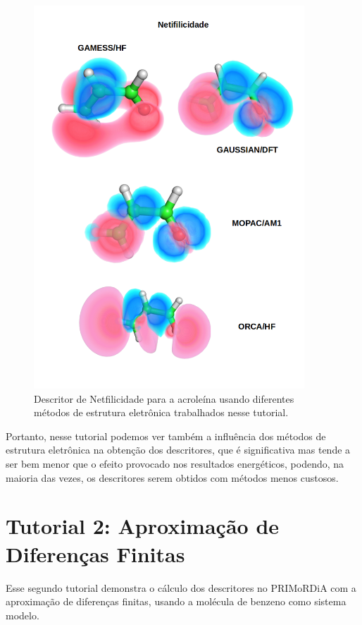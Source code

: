 \documentclass[a4paper,11pt]{refart}
\begin{document}
\hspace*{-\leftmarginwidth}
\begin{minipage}{\fullwidth}
\begin{figure}[H]
\begin{center}
\includegraphics[width=4in]{images/img11}
\caption{Descritor de Netfilicidade para a acroleína usando diferentes métodos de estrutura eletrônica trabalhados nesse tutorial.}
\label{fig_tut1_10}
\end{center}
\end{figure}
\end{minipage}

Portanto, nesse tutorial podemos ver também a influência dos métodos de estrutura eletrônica na obtenção dos descritores, que é significativa mas tende a ser bem menor que o efeito provocado nos resultados energéticos, podendo, na maioria das vezes, os descritores serem obtidos com métodos menos custosos. 

\newpage
\section{Tutorial 2: Aproximação de Diferenças Finitas}

Esse segundo tutorial demonstra o cálculo dos descritores no PRIMoRDiA com a aproximação de diferenças finitas, usando a molécula de benzeno como sistema modelo.  
\end{document}
